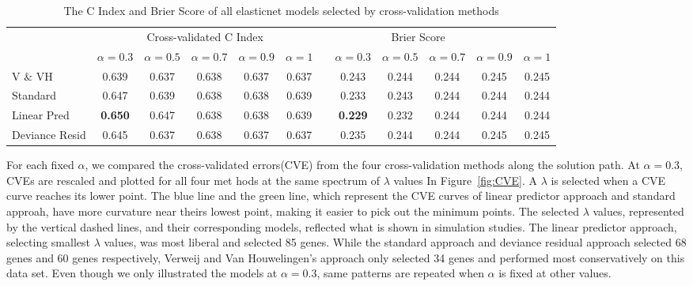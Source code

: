 \begin{table}[ht]
\centering
\caption{\label{tb:shedden} The C Index and Brier Score of all elasticnet models selected by cross-validation methods }
\begin{tabular}{lccccccccccc}
\hline
  & \multicolumn{5}{c}{Cross-validated C Index} & \multicolumn{5}{c}{Brier Score} \\ 
  & $\alpha = 0.3$ & $\alpha = 0.5$ & $\alpha = 0.7$ & $\alpha = 0.9$ & $\alpha = 1$ &  
 & $\alpha = 0.3$ & $\alpha = 0.5$ & $\alpha = 0.7$ & $\alpha = 0.9$ & $\alpha = 1$ \\ \cline{2-6} \cline{8-12} 
V $\&$ VH      & 0.639 & 0.637 & 0.638 & 0.637 & 0.637 &  & 0.243 & 0.244 & 0.244 & 0.245 & 0.245 \\
Standard       & 0.647 & 0.639 & 0.638 & 0.638 & 0.639 &  & 0.233 & 0.243 & 0.244 & 0.244 & 0.244 \\
Linear Pred    & \textbf{0.650} & 0.647 & 0.638 & 0.638 & 0.639 &  & \textbf{0.229} & 0.232 & 0.244 & 0.244 & 0.244 \\
Deviance Resid & 0.645 & 0.637 & 0.638 & 0.637 & 0.637 &  & 0.235 & 0.244 & 0.244 & 0.245 & 0.245 \\ \hline
\end{tabular}
\end{table}

For each fixed $\alpha$, we compared the cross-validated errors(CVE) from the four cross-validation methods along the solution path. At $\alpha = 0.3$, CVEs are rescaled and plotted for all four met  hods at the same spectrum of $\lambda$ values In Figure~\ref{fig:CVE}. A $\lambda$ is selected when a CVE curve reaches its lower point. The blue line and the green line, which represent the CVE curves of linear predictor approach and standard approah, have more curvature near theirs lowest point, making it easier to pick out the minimum points. The selected $\lambda$ values, represented by the vertical dashed lines, and their corresponding models, reflected what is shown in simulation studies. The linear predictor approach, selecting smallest $\lambda$ values, was most liberal and selected 85 genes. While the standard approach and deviance residual approach selected 68 genes and 60 genes respectively, Verweij and Van Houwelingen's approach only selected 34 genes and performed most conservatively on this data set. Even though we only illustrated the models at $\alpha = 0.3$, same patterns are repeated when $\alpha$ is fixed at other values.

